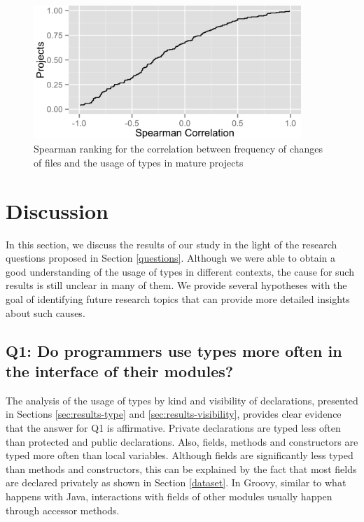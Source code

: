 \documentclass[msc]{ppgccufmg}
\begin{document}
\begin{figure}[h]
\centering \includegraphics[width=0.9\textwidth]{../aosd_2014/analysis/result/change_commits_distribution.png} 
\caption{Spearman ranking for the correlation between frequency of changes of files and the usage of types in mature projects}
\label{fig:change_spearman} 
\end{figure}
















%
%
\chapter{Discussion\label{discussion}}
In this section, we discuss the results of our study in the light of the research questions proposed in Section \ref{questions}.
Although we were able to obtain a good understanding of the usage of types in different contexts, the cause for such results is still unclear in many of them.
We provide several hypotheses with the goal of identifying future research topics that can provide more detailed insights about such causes.

\section*{Q1: Do programmers use types more often in the interface of their modules?\label{discussion-q1}}
The analysis of the usage of types by kind and visibility of declarations, presented in Sections \ref{sec:results-type} and \ref{sec:results-visibility}, provides clear evidence that the answer for Q1 is affirmative.
Private declarations are typed less often than protected and public declarations.
Also, fields, methods and constructors are typed more often than local variables.
Although fields are significantly less typed than methods and constructors, this can be explained by the fact that most fields are declared privately as shown in Section \ref{dataset}.
In Groovy, similar to what happens with Java, interactions with fields of other modules usually happen through accessor methods.
\end{document}
